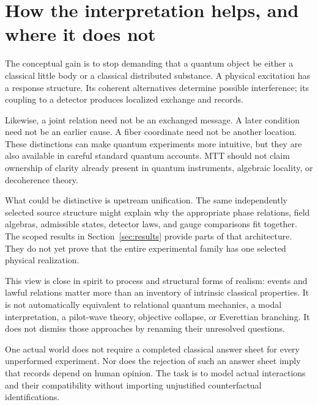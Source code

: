 \documentclass[11pt,a4paper]{article}
\begin{document}
\section{How the interpretation helps, and where it does not}
\label{sec:comparison}
The conceptual gain is to stop demanding that a quantum object be either a classical little body or a classical distributed substance. A physical excitation has a response structure. Its coherent alternatives determine possible interference; its coupling to a detector produces localized exchange and records.

Likewise, a joint relation need not be an exchanged message. A later condition need not be an earlier cause. A fiber coordinate need not be another location. These distinctions can make quantum experiments more intuitive, but they are also available in careful standard quantum accounts. MTT should not claim ownership of clarity already present in quantum instruments, algebraic locality, or decoherence theory.

What could be distinctive is upstream unification. The same independently selected source structure might explain why the appropriate phase relations, field algebras, admissible states, detector laws, and gauge comparisons fit together. The scoped results in Section~\ref{sec:results} provide parts of that architecture. They do not yet prove that the entire experimental family has one selected physical realization.

This view is close in spirit to process and structural forms of realism: events and lawful relations matter more than an inventory of intrinsic classical properties. It is not automatically equivalent to relational quantum mechanics, a modal interpretation, a pilot-wave theory, objective collapse, or Everettian branching. It does not dismiss those approaches by renaming their unresolved questions.

One actual world does not require a completed classical answer sheet for every unperformed experiment. Nor does the rejection of such an answer sheet imply that records depend on human opinion. The task is to model actual interactions and their compatibility without importing unjustified counterfactual identifications.
\end{document}
